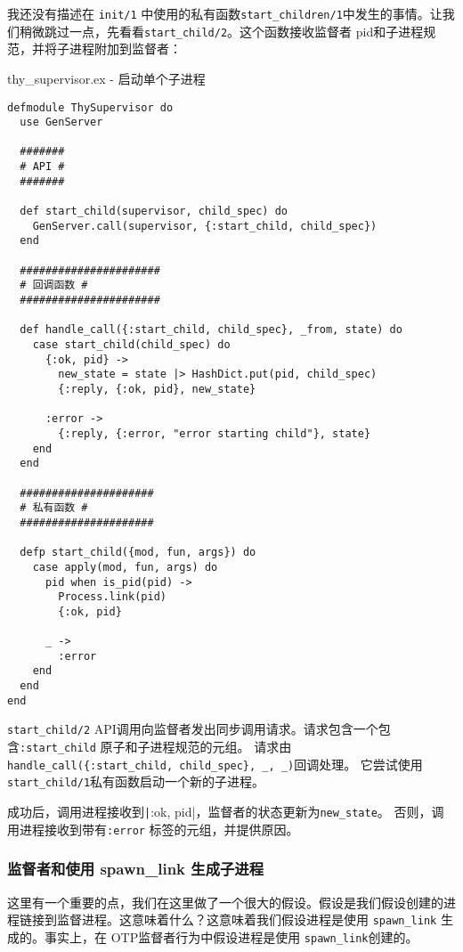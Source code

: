 我还没有描述在 \texttt{init/1} 中使用的私有函数\texttt{start\_children/1}中发生的事情。让我们稍微跳过一点，先看看\texttt{start\_child/2}。这个函数接收监督者 pid和子进程规范，并将子进程附加到监督者：

\begin{code}{thy\_supervisor.ex - 启动单个子进程}
\begin{verbatim}
defmodule ThySupervisor do
  use GenServer

  #######
  # API #
  #######

  def start_child(supervisor, child_spec) do
    GenServer.call(supervisor, {:start_child, child_spec})
  end

  ######################
  # 回调函数 #
  ######################

  def handle_call({:start_child, child_spec}, _from, state) do
    case start_child(child_spec) do
      {:ok, pid} ->
        new_state = state |> HashDict.put(pid, child_spec)
        {:reply, {:ok, pid}, new_state}

      :error ->
        {:reply, {:error, "error starting child"}, state}
    end
  end

  #####################
  # 私有函数 #
  #####################

  defp start_child({mod, fun, args}) do
    case apply(mod, fun, args) do
      pid when is_pid(pid) ->
        Process.link(pid)
        {:ok, pid}

      _ ->
        :error
    end
  end
end
\end{verbatim}
\label{lst:start_single_child}
\end{code}

\texttt{start\_child/2} API调用向监督者发出同步调用请求。请求包含一个包含\texttt{:start\_child} 原子和子进程规范的元组。
请求由\texttt{handle\_call(\{:start\_child, child\_spec\}, \_, \_)}回调处理。
它尝试使用 \texttt{start\_child/1}私有函数启动一个新的子进程。

成功后，调用进程接收到\texttt|{:ok, pid}|，监督者的状态更新为\texttt{new\_state}。
否则，调用进程接收到带有\texttt{:error} 标签的元组，并提供原因。

\subsubsection{监督者和使用 spawn\_link 生成子进程}

这里有一个重要的点，我们在这里做了一个很大的假设。假设是我们假设创建的进程链接到监督进程。这意味着什么？这意味着我们假设进程是使用
\texttt{spawn\_link} 生成的。事实上，在 OTP监督者行为中假设进程是使用 \texttt{spawn\_link}创建的。

